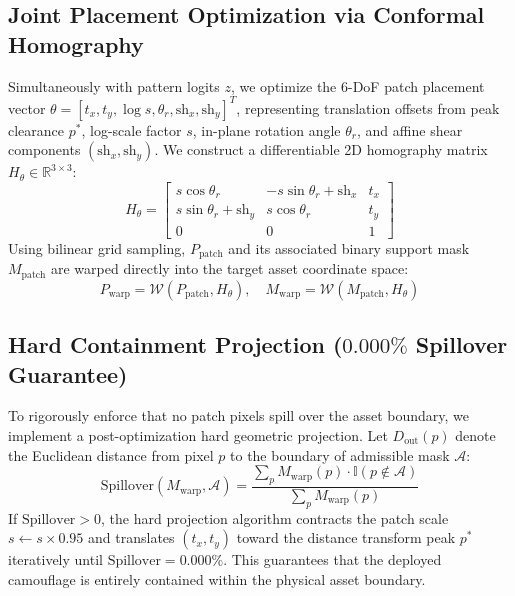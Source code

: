 \documentclass[conference]{IEEEtran}
\begin{document}
\subsection{Joint Placement Optimization via Conformal Homography}
Simultaneously with pattern logits $z$, we optimize the 6-DoF patch placement vector $\theta = [t_x, t_y, \log s, \theta_r, \text{sh}_x, \text{sh}_y]^T$, representing translation offsets from peak clearance $p^*$, log-scale factor $s$, in-plane rotation angle $\theta_r$, and affine shear components $(\text{sh}_x, \text{sh}_y)$. We construct a differentiable 2D homography matrix $H_\theta \in \mathbb{R}^{3 \times 3}$:
\begin{equation}
H_\theta = \begin{bmatrix} s \cos\theta_r & -s \sin\theta_r + \text{sh}_x & t_x \\ s \sin\theta_r + \text{sh}_y & s \cos\theta_r & t_y \\ 0 & 0 & 1 \end{bmatrix}
\end{equation}
Using bilinear grid sampling, $P_{\text{patch}}$ and its associated binary support mask $M_{\text{patch}}$ are warped directly into the target asset coordinate space:
\begin{equation}
P_{\text{warp}} = \mathcal{W}(P_{\text{patch}}, H_\theta), \quad M_{\text{warp}} = \mathcal{W}(M_{\text{patch}}, H_\theta)
\end{equation}

\subsection{Hard Containment Projection ($0.000\%$ Spillover Guarantee)}
To rigorously enforce that no patch pixels spill over the asset boundary, we implement a post-optimization hard geometric projection. Let $D_{\text{out}}(p)$ denote the Euclidean distance from pixel $p$ to the boundary of admissible mask $\mathcal{A}$:
\begin{equation}
\text{Spillover}(M_{\text{warp}}, \mathcal{A}) = \frac{\sum_{p} M_{\text{warp}}(p) \cdot \mathbb{I}(p \notin \mathcal{A})}{\sum_{p} M_{\text{warp}}(p)}
\end{equation}
If $\text{Spillover} > 0$, the hard projection algorithm contracts the patch scale $s \leftarrow s \times 0.95$ and translates $(t_x, t_y)$ toward the distance transform peak $p^*$ iteratively until $\text{Spillover} = 0.000\%$. This guarantees that the deployed camouflage is entirely contained within the physical asset boundary.
\end{document}
